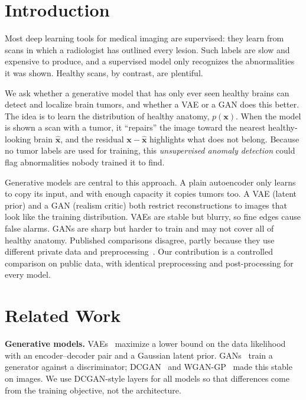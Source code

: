 \documentclass{article}
\begin{document}
\section{Introduction}

Most deep learning tools for medical imaging are supervised: they learn from
scans in which a radiologist has outlined every lesion. Such labels are slow and
expensive to produce, and a supervised model only recognizes the abnormalities
it was shown. Healthy scans, by contrast, are plentiful.

We ask whether a generative model that has only ever seen healthy brains can
detect and localize brain tumors, and whether a VAE or a GAN does this better.
The idea is to learn the distribution of healthy anatomy, $p(\mathbf{x})$. When
the model is shown a scan with a tumor, it ``repairs'' the image toward the
nearest healthy-looking brain $\hat{\mathbf{x}}$, and the residual
$\mathbf{x}-\hat{\mathbf{x}}$ highlights what does not belong. Because no tumor
labels are used for training, this \emph{unsupervised anomaly detection} could
flag abnormalities nobody trained it to find.

Generative models are central to this approach. A plain autoencoder only learns
to copy its input, and with enough capacity it copies tumors too. A VAE (latent
prior) and a GAN (realism critic) both restrict reconstructions to images that
look like the training distribution. VAEs are stable but blurry, so fine edges
cause false alarms. GANs are sharp but harder to train and may not cover all of
healthy anatomy. Published comparisons disagree, partly because they use different
private data and preprocessing~\cite{baur2021comparative}. Our contribution is a
controlled comparison on public data, with identical preprocessing and
post-processing for every model.

\section{Related Work}

\textbf{Generative models.} VAEs~\cite{kingma2014vae} maximize a lower bound on
the data likelihood with an encoder--decoder pair and a Gaussian latent prior.
GANs~\cite{goodfellow2014gan} train a generator against a discriminator;
DCGAN~\cite{radford2016dcgan} and WGAN-GP~\cite{gulrajani2017wgangp} made this
stable on images. We use DCGAN-style layers for all models so that differences
come from the training objective, not the architecture.
\end{document}
